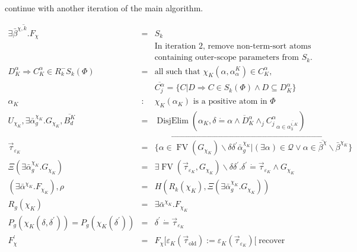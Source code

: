 \documentclass{article}
\newcommand{\assign}{:=}
\newcommand{\tmop}[1]{\ensuremath{\operatorname{#1}}}
\begin{document}
continue with another iteration of the main algorithm.\begin{table}[t]
  \label{MainAlgIter}
  \begin{eqnarray}
    \overline{\exists \bar{\beta}^{\chi, k} .F_{\chi}} & = & S_k \nonumber\\
    &  & \text{In iteration 2, remove non-term-sort atoms} \nonumber\\
    &  & \text{containing outer-scope parameters from } S_k . \nonumber\\
    D_K^{\alpha} \Rightarrow C_K^{\alpha} \in R_k^- S_k (\Phi) & = & \text{all
    such that } \chi_K (\alpha, \alpha_{\alpha}^K) \in C_K^{\alpha}, 
    \label{MainAlgEnt1}\\
    &  & \overline{C^{\alpha}_j} = \{ C | D \Rightarrow C \in S_k (\Phi)
    \wedge D \subseteq D^{\alpha}_K \} \nonumber\\
    \alpha_K & : & \chi_K (\alpha_K) \text{ is a positive atom in } \Phi
    \nonumber\\
    U_{\chi_K}, \exists \bar{\alpha}^{\chi_K}_g .G_{\chi_K}, \overline{B_d^K}
    & = & \tmop{DisjElim} \left( \alpha_K, \overline{\delta \dot{=} \alpha
    \wedge D^{\alpha}_K \wedge_j C^{\alpha}_j}_{\alpha \in
    \overline{\alpha_3^{i, K}}} \right)  \label{MainAlgEnt2}\\
    \vec{\tau}_{\varepsilon_K} & = & \overrightarrow{\{ \alpha \in \tmop{FV}
    (G_{\chi_K}) \backslash \delta \delta^{\prime} \bar{\alpha}^{\chi_K}_g |
    (\exists \alpha) \in \mathcal{Q} \vee \alpha \in
    \overline{\bar{\beta}^{\chi}} \backslash \bar{\beta}^{\chi_K} \}}
    \nonumber\\
    \Xi (\exists \bar{\alpha}^{\chi_K}_g .G_{\chi_K}) & = & \exists \tmop{FV}
    (\vec{\tau}_{\varepsilon_K}, G_{\chi_K}) \backslash \delta \delta^{\prime}
    . \delta^{\prime} \dot{=} \vec{\tau}_{\varepsilon_K} \wedge G_{\chi_K}
    \nonumber\\
    (\exists \bar{\alpha}^{\chi_K} .F_{\chi_K}), \rho & = & H (R_k (\chi_K),
    \Xi (\exists \bar{\alpha}_g^{\chi_K} .G_{\chi_K})) \nonumber\\
    R_g (\chi_K) & = & \exists \bar{\alpha}^{\chi_K} .F_{\chi_K} \nonumber\\
    P_g (\chi_K (\delta, \delta^{\prime})) = P_g (\chi_K (\delta^{\prime})) &
    = & \delta^{\prime} \dot{=} \vec{\tau}_{\varepsilon_K} \nonumber\\
    F_{\chi}^{\prime} & = & F_{\chi} [\varepsilon_K (\vec{\tau}_{\tmop{old}})
    \assign \varepsilon_K (\vec{\tau}_{\varepsilon_K}) [\tmop{recover}

\end{eqnarray}
\end{table}
\end{document}
